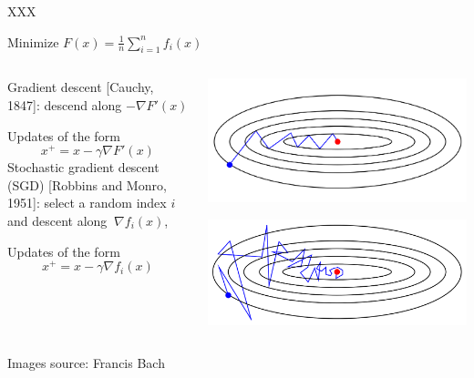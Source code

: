 \documentclass[10pt, notes]{beamer}
\begin{document}
\begin{frame}{XXX}
\begin{center}
{ Minimize $F(x) = \frac{1}{n}\sum^{n}_{i=1} f_i(x)$}
\end{center}

\begin{columns}
\begin{column}{0.5\textwidth}  %
Gradient descent [Cauchy, 1847]: descend along $-\nabla F'(x)$

Updates of the form $$x^+ = x - \gamma \nabla F'(x)$$
Stochastic gradient descent (SGD) [Robbins and Monro, 1951]: select a random index $i$ and descent along $~\nabla f_i(x)$,

Updates of the form $$x^+ = x - \gamma \nabla f_i(x)$$

\end{column}
\begin{column}{0.5\textwidth}  %
\includegraphics[width=\linewidth]{img/gd}

\vspace{2em}
\includegraphics[width=\linewidth]{img/sgd}

\end{column}
\end{columns}







Images source: Francis Bach

\end{frame}
\end{document}
